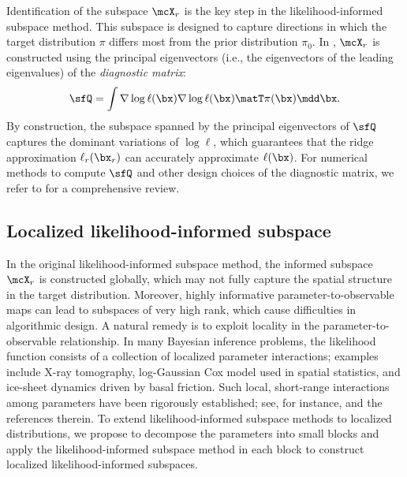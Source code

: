\documentclass[11pt]{article}
\begin{document}
Identification of the subspace $\mcX_r$ is the key step in the likelihood-informed subspace method.
This subspace is designed to capture directions in which the target distribution $\pi$ differs most from the prior distribution $\pi_0$.
%
In \cite{MR3274599,MR4474562}, $\mcX_r$ is constructed using the principal eigenvectors (i.e., the eigenvectors of the leading eigenvalues) of the \emph{diagnostic matrix}:
\begin{equation}
    \sfQ = \int \nabla \log \ell(\bx) \nabla \log \ell(\bx) \matT \pi(\bx) \mdd \bx.
\end{equation}
By construction, the subspace spanned by the principal eigenvectors of $\sfQ$ captures the dominant variations of $\log \ell$, which guarantees that the ridge approximation $\ell_r(\bx_r)$ can accurately approximate $\ell(\bx)$.
%
For numerical methods to compute $\sfQ$ and other design choices of the diagnostic matrix, we refer to \cite{MR4474562} for a comprehensive review.




\subsection{Localized likelihood-informed subspace}
\label{sec:LLIS_method}

In the original likelihood-informed subspace method, the informed subspace $\mcX_r$ is constructed globally, which may not fully capture the spatial structure in the target distribution.
Moreover, highly informative parameter-to-observable maps can lead to subspaces of very high rank, which cause difficulties in algorithmic design.
%
A natural remedy is to exploit locality in the parameter-to-observable relationship.
In many Bayesian inference problems, the likelihood function consists of a collection of localized parameter interactions; examples include X-ray tomography, log-Gaussian Cox model used in spatial statistics, and ice-sheet dynamics driven by basal friction.
Such local, short-range interactions among parameters have been rigorously established; see, for instance, \cite{MR4744996,MR4608791} and the references therein.
To extend likelihood-informed subspace methods to localized distributions, we propose to decompose the parameters into small blocks and apply the likelihood-informed subspace method in each block to construct localized likelihood-informed subspaces.
\end{document}
